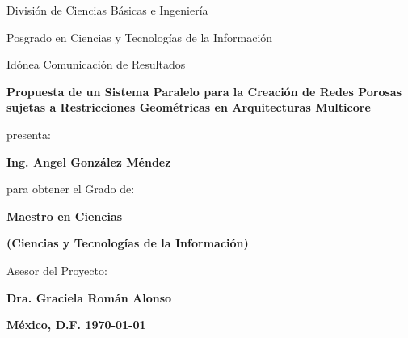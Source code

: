 
\vspace{1.5cm}
\centerline{\large  División de Ciencias Básicas e Ingeniería}
\vspace{0.5cm}
\centerline{\large Posgrado en Ciencias y Tecnologías de la Información}
\vspace{0.5cm}
\centerline{\large  Idónea Comunicación de Resultados}

\begin{center}
\Large \bf
Propuesta de un Sistema Paralelo para la Creación de Redes Porosas sujetas a Restricciones Geométricas en Arquitecturas Multicore
\end{center}

\centerline{\normalsize presenta:}
\vspace{0.1cm}
\centerline{\Large \bf Ing. Angel González Méndez}
\vspace{0.5cm}
\centerline{\normalsize para obtener el Grado de:}
\vspace{0.1cm}
\centerline{\Large \bf Maestro en Ciencias}
\centerline{\Large \bf (Ciencias y Tecnologías de la Información)}
\vspace{1.0cm}
\centerline{Asesor del Proyecto:}
\vspace{0.1cm}
\centerline{\Large \bf Dra. Graciela Román Alonso}
\vspace{0.5cm}
 
\vspace{1.2cm}
{\large \bf México, D.F. \hfill  \mydate\today}

\cleardoublepage